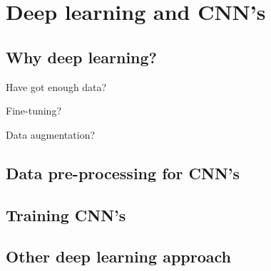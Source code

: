 \section{Deep learning and CNN's}


\subsection{Why deep learning?}


Have got enough data? 

Fine-tuning?

Data augmentation?

\subsection{Data pre-processing for CNN's}




\subsection{Training CNN's}





\subsection{Other deep learning approach}


